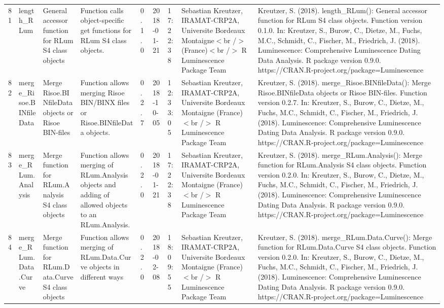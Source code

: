 \begin{table}[ht]
\begin{tabular}{rllllllll}
  81 & length\_RLum & General accessor function for RLum S4 class objects & Function calls object-specific get functions for RLum S4 class objects. & 0.1.0 & 2018-01-21 & 17:22:38
 & Sebastian Kreutzer, IRAMAT-CRP2A, Universite Bordeaux Montaigne$<$br /$>$ (France)$<$br /$>$  R Luminescence Package Team & Kreutzer, S. (2018). length\_RLum(): General accessor function for RLum S4 class objects. Function version 0.1.0. In: Kreutzer, S., Burow, C., Dietze, M., Fuchs, M.C., Schmidt, C., Fischer, M., Friedrich, J. (2018). Luminescence: Comprehensive Luminescence Dating Data Analysis. R package version 0.9.0. https://CRAN.R-project.org/package=Luminescence
 \\ 
  82 & merge\_Risoe.BINfileData & Merge Risoe.BINfileData objects or Risoe BIN-files & Function allows merging Risoe BIN/BINX files or Risoe.BINfileData objects. & 0.2.7 & 2018-10-05 & 12:33:05
 & Sebastian Kreutzer, IRAMAT-CRP2A, Universite Bordeaux Montaigne (France)$<$br /$>$  R Luminescence Package Team & Kreutzer, S. (2018). merge\_Risoe.BINfileData(): Merge Risoe.BINfileData objects or Risoe BIN-files. Function version 0.2.7. In: Kreutzer, S., Burow, C., Dietze, M., Fuchs, M.C., Schmidt, C., Fischer, M., Friedrich, J. (2018). Luminescence: Comprehensive Luminescence Dating Data Analysis. R package version 0.9.0. https://CRAN.R-project.org/package=Luminescence
 \\ 
  83 & merge\_RLum.Analysis & Merge function for RLum.Analysis S4 class objects & Function allows merging of RLum.Analysis objects and adding of allowed objects to an RLum.Analysis. & 0.2.0 & 2018-01-21 & 17:22:38
 & Sebastian Kreutzer, IRAMAT-CRP2A, Universite Bordeaux Montaigne (France)$<$br /$>$  R Luminescence Package Team & Kreutzer, S. (2018). merge\_RLum.Analysis(): Merge function for RLum.Analysis S4 class objects. Function version 0.2.0. In: Kreutzer, S., Burow, C., Dietze, M., Fuchs, M.C., Schmidt, C., Fischer, M., Friedrich, J. (2018). Luminescence: Comprehensive Luminescence Dating Data Analysis. R package version 0.9.0. https://CRAN.R-project.org/package=Luminescence
 \\ 
  84 & merge\_RLum.Data.Curve & Merge function for RLum.Data.Curve S4 class objects & Function allows merging of RLum.Data.Curve objects in different ways & 0.2.0 & 2018-02-08 & 18:09:55
 & Sebastian Kreutzer, IRAMAT-CRP2A, Universite Bordeaux Montaigne (France)$<$br /$>$  R Luminescence Package Team & Kreutzer, S. (2018). merge\_RLum.Data.Curve(): Merge function for RLum.Data.Curve S4 class objects. Function version 0.2.0. In: Kreutzer, S., Burow, C., Dietze, M., Fuchs, M.C., Schmidt, C., Fischer, M., Friedrich, J. (2018). Luminescence: Comprehensive Luminescence Dating Data Analysis. R package version 0.9.0. https://CRAN.R-project.org/package=Luminescence

\end{tabular}
\end{table}
